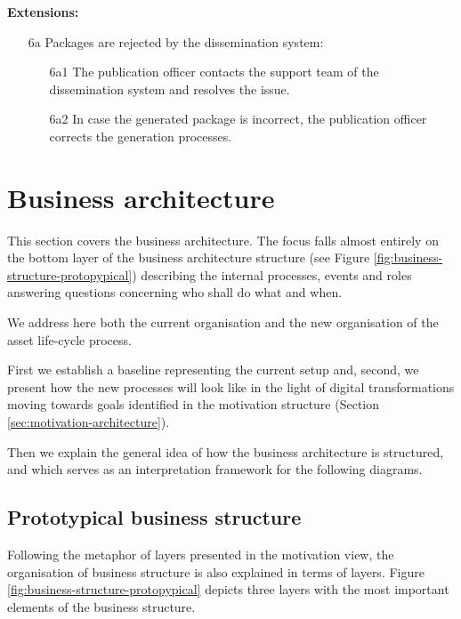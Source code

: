 	\textbf{Extensions:}
	\begin{enumerate}
		\item [6a] Packages are rejected by the dissemination system:
		\begin{enumerate}
			\item [6a1] The publication officer contacts the support team of the dissemination system and resolves the issue. 
			\item [6a2] In case the generated package is incorrect, the publication officer corrects the generation processes.
		\end{enumerate}
	\end{enumerate}
	
\section{Business architecture}
\label{sec:business-architecture}
	
	This section covers the business architecture. The focus falls almost entirely on the bottom layer of the business architecture structure (see Figure \ref{fig:business-structure-protopypical}) describing the internal processes, events and roles answering questions concerning who shall do what and when.
	
	
	We address here both the current organisation and the new organisation of the asset life-cycle process. 
	
	First we establish a baseline representing the current setup and, second, we present how the new processes will look like in the light of digital transformations moving towards goals identified in the motivation structure (Section \ref{sec:motivation-architecture}).
	
	Then we explain the general idea of how the business architecture is structured, and which serves as an interpretation framework for the following diagrams. 	
	
	\subsection{Prototypical business structure}
	
	Following the metaphor of layers presented in the motivation view, the organisation of business structure is also explained in terms of layers. Figure \ref{fig:business-structure-protopypical} depicts three layers with the most important elements of the business structure. 
	
	
